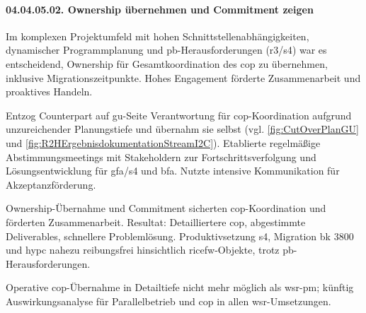 \paragraph*{04.04.05.02. Ownership übernehmen und Commitment zeigen}
\label{para:04.04.05.02_OwnershipUndCommitment}

\par Im komplexen Projektumfeld mit hohen Schnittstellenabhängigkeiten, dynamischer Programmplanung und \gls{pb}-Herausforderungen (\gls{r3}/\gls{s4}) war es entscheidend, Ownership für Gesamtkoordination des \gls{cop} zu übernehmen, inklusive Migrationszeitpunkte. Hohes Engagement förderte Zusammenarbeit und proaktives Handeln.

\par Entzog Counterpart auf \gls{gu}-Seite Verantwortung für \gls{cop}-Koordination aufgrund unzureichender Planungstiefe und übernahm sie selbst (vgl. \autoref{fig:CutOverPlanGU} und \autoref{fig:R2HErgebnisdokumentationStreamI2C}). Etablierte regelmäßige Abstimmungsmeetings mit Stakeholdern zur Fortschrittsverfolgung und Lösungsentwicklung für \gls{gfa}/\gls{s4} und \gls{bfa}. Nutzte intensive Kommunikation für Akzeptanzförderung.

\par Ownership-Übernahme und Commitment sicherten \gls{cop}-Koordination und förderten Zusammenarbeit. Resultat: Detailliertere \gls{cop}, abgestimmte Deliverables, schnellere Problemlösung. Produktivsetzung \gls{s4}, Migration \gls{bk} 3800 und \gls{hypc} nahezu reibungsfrei hinsichtlich \gls{ricefw}-Objekte, trotz \gls{pb}-Herausforderungen.

\par Operative \gls{cop}-Übernahme in Detailtiefe nicht mehr möglich als \gls{wsr}-\gls{pm}; künftig Auswirkungsanalyse für Parallelbetrieb und \gls{cop} in allen \gls{wsr}-Umsetzungen.
